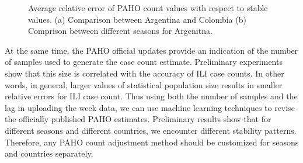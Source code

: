 \begin{figure}[h]
  \captionsetup{font=scriptsize}
  \centering
{}
\hspace{1em}
  \scriptsize
\caption{
  \label{fig:relerrors:all}
  Average relative error of PAHO count values with respect to stable values.
  (a) Comparison between Argentina and Colombia (b) Comprison between different 
  seasons for Argenitna.}
  \vspace{-1em}
\end{figure}



At the same time, the PAHO official updates provide an indication of the number of samples
used to generate the case count estimate. Preliminary experiments show that
this size is correlated with the accuracy of ILI case counts. In other words,
in general, larger values of statistical population size results in smaller
relative errors for ILI case count. Thus using both the number of samples and the lag in 
uploading the week data, we can use machine learning techniques to revise the officially 
published PAHO estimates. Preliminary results
show that for different seasons and different countries, we encounter different
stability patterns. Therefore, any PAHO count adjustment method should be
customized for seasons and countries separately. 

